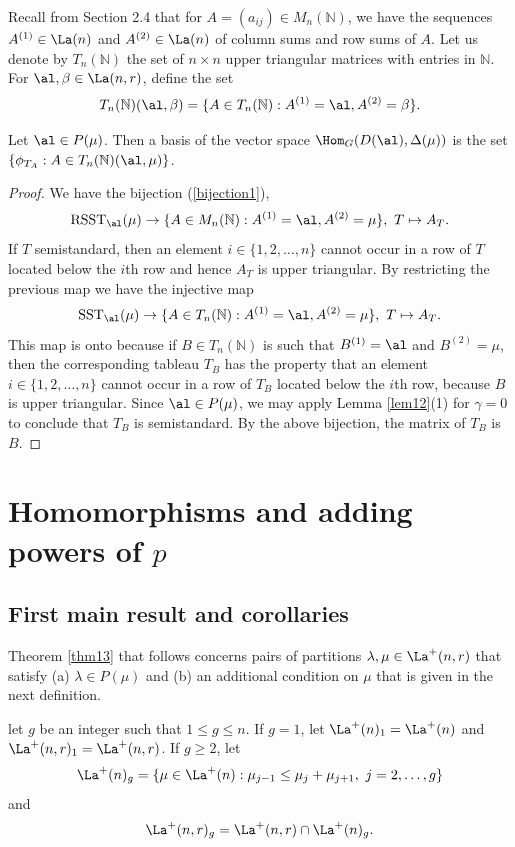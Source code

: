 	Recall from Section 2.4 that for $A=(a_{ij}) \in M_{n}(\mathbb{N})$, we have the sequences $A^{(1)}\in \La(n)$ and $A^{(2)}\in \La(n)$ of column sums and row sums of $A$. Let us denote by $T_{n}(\mathbb{N})$ the set of $n \times n$ upper triangular matrices with entries in $\mathbb{N}$. For $\al, \beta  \in \La(n,r)$, define the set \[T_{n}(\mathbb{N})(\al, \beta) = \{A \in T_{n}(\mathbb{N}): A^{(1)}=\al, A^{(2)}=\beta\}.\]
	\begin{coro}\label{triang}
		Let $\al \in P(\mu)$. Then a basis of the vector space $\Hom_G(D(\al),\Delta(\mu))$ is the set $\{\phi_{T_A}: A \in T_{n}(\mathbb{N})(\al, \mu)\}$.
	\end{coro}
\begin{proof} We have the bijection (\ref{bijection1}), \[\mathrm{RSST}_{\al}(\mu) \to \{A \in M_{n}(\mathbb{N}): A^{(1)}=\al, A^{(2)}=\mu\}, \ T \mapsto A_T.\] If $T$ semistandard, then an element $i \in \{1,2,\dots,n\}$ cannot occur in a row of $T$ located below the $i$th row and hence $ A_T$ is upper triangular. By restricting the previous map we have the injective map \[\mathrm{SST}_{\al}(\mu) \to \{A \in T_{n}(\mathbb{N}): A^{(1)}=\al, A^{(2)}=\mu\}, \ T \mapsto A_T.\]
	This map is onto because if $B \in T_{n}(\mathbb{N})$ is such that $B^{(1)}=\al$ and $ B^{(2)}=\mu$, then the corresponding tableau $T_B$ has the property that an element $i \in \{1,2,\dots,n\}$ cannot occur in a row of $T_B$ located below the $i$th row, because $B$ is upper triangular. Since $\al \in P(\mu)$, we may apply  Lemma \ref{lem12}(1) for $\gamma =0$ to conclude that $T_B$ is semistandard. By the above bijection, the matrix of $T_B$ is $B$.
	\end{proof}

	\section{Homomorphisms and adding powers of \texorpdfstring{$p$}{p}}
	\subsection{First main result and corollaries} Theorem \ref{thm13} that follows concerns pairs of partitions $\lambda, \mu \in \La^+(n,r)$ that satisfy (a) $\lambda \in P(\mu)$ and (b) an additional condition on $\mu$ that is given in the next definition.
	\begin{defi}\label{def}
		let $g$ be an integer such that $1 \le g \le n$. If $g=1$, let $\La^{+}(n)_1=\La^{+}(n)$ and $\La^{+}(n,r)_1=\La^{+}(n,r)$. If $g \ge 2$, let \[ \La^{+}(n)_g=\{\mu \in \La^{+}(n): \mu_{j-1} \le \mu_j +\mu_{j+1}, \ j=2,\dots,g\} \] and \[\La^{+}(n,r)_g= \La^{+}(n,r) \cap \La^{+}(n)_g.\]
	\end{defi}
	
